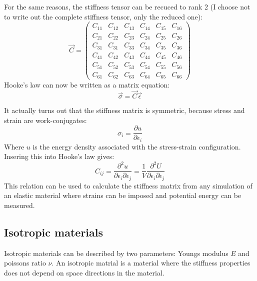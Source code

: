 For the same reasons, the stiffness tensor can be recuced to rank 2 (I choose not to write out the complete stiffness tensor, only the reduced one):
\begin{equation}
	\vec{C} =
	\begin{pmatrix}
	C_{11} & C_{12} & C_{13} & C_{14} & C_{15} & C_{16} \\
	C_{21} & C_{22} & C_{23} & C_{24} & C_{25} & C_{26} \\
	C_{31} & C_{31} & C_{33} & C_{34} & C_{35} & C_{36} \\
	C_{41} & C_{42} & C_{43} & C_{44} & C_{45} & C_{46} \\
	C_{51} & C_{52} & C_{53} & C_{54} & C_{55} & C_{56} \\
	C_{61} & C_{62} & C_{63} & C_{64} & C_{65} & C_{66}
	\end{pmatrix}
\end{equation}
Hooke's law can now be written as a matrix equation:
\begin{equation}
	\vec{\sigma} = \vec{C}\vec{\epsilon}
\end{equation}

It actually turns out that the stiffness matrix is symmetric, because stress and strain are work-conjugates:
\begin{equation}
	\sigma_i = \frac{\partial u}{\partial \epsilon_i}
\end{equation}
Where $u$ is the energy density associated with the stress-strain configuration.
Insering this into Hooke's law gives:
\begin{equation}
	C_{ij}=\frac{\partial^2 u}{\partial \epsilon_i \partial \epsilon_j} = \frac{1}{V} \frac{\partial^2 U}{\partial \epsilon_i \partial \epsilon_j} 
\end{equation}
This relation can be used to calculate the stiffness matrix from any simulation of an elastic material where strains can be imposed and potential energy can be measured.

\subsection{Isotropic materials}
Isotropic materials can be described by two parameters: Youngs modulus $E$ and poissons ratio $\nu$. An isotropic matrial is a material where the stiffness properties does not depend on space directions in the material. 

